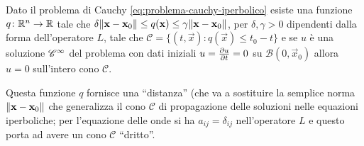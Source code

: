 \begin{teorema}
    Dato il problema di Cauchy \eqref{eq:problema-cauchy-iperbolico} esiste una funzione $q\colon\R^n\to\R$ tale che $\delta\norm{\vec x-\vec x_0}\le q(\vec x)\le\gamma\norm{\vec x-\vec x_0}$, per $\delta,\gamma>0$ dipendenti dalla forma dell'operatore $L$, tale che $\mathcal{C}=\{(t,\vec x)\colon q(\vec x)\le t_0-t\}$ e se $u$ è una soluzione $\cclass[\infty]$ del problema con dati iniziali $u=\drp{u}{t}=0$ su $\mathcal{B}(0,\vec x_0)$ allora $u=0$ sull'intero cono $\mathcal{C}$.
\end{teorema}
Questa funzione $q$ fornisce una ``distanza'' (che va a sostituire la semplice norma $\norm{\vec x-\vec x_0}$ che generalizza il cono $\mathcal{C}$ di propagazione delle soluzioni nelle equazioni iperboliche; per l'equazione delle onde si ha $a_{ij}=\delta_{ij}$ nell'operatore $L$ e questo porta ad avere un cono $\mathcal{C}$ ``dritto''.
